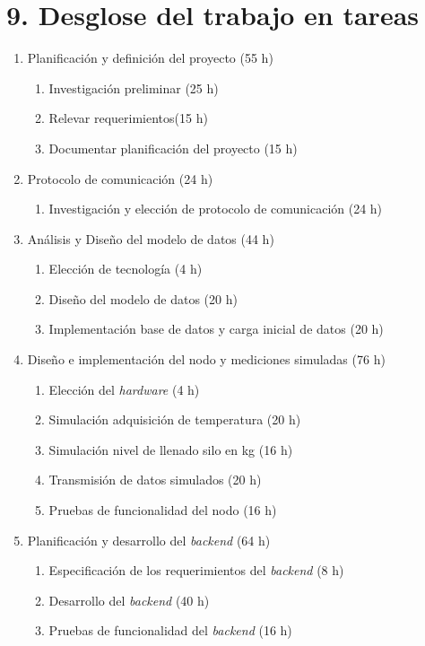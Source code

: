 \documentclass[
11pt, %
]{charter}
\begin{document}
\section{9. Desglose del trabajo en tareas}
\label{sec:wbs}

\begin{enumerate}
\item Planificación y definición del proyecto (55 h)
	\begin{enumerate}
	\item Investigación preliminar (25 h)
	\item Relevar requerimientos(15 h)
	\item Documentar planificación del proyecto (15 h)
	\end{enumerate}
\item Protocolo de comunicación (24 h)
	\begin{enumerate}
	\item Investigación y elección de protocolo de comunicación (24 h)
	\end{enumerate}
\item Análisis y Diseño del modelo de datos (44 h)
	\begin{enumerate}
	\item Elección de tecnología (4 h)
	\item Diseño del modelo de datos (20 h)
	\item Implementación base de datos y carga inicial de datos (20 h)
	\end{enumerate}
\item Diseño e implementación del nodo y mediciones simuladas (76 h)
	\begin{enumerate}
	\item Elección del \textit{hardware} (4 h)
	\item Simulación adquisición de temperatura (20 h)
	\item Simulación nivel de llenado silo en kg (16 h)
	\item Transmisión de datos simulados (20 h)
	\item Pruebas de funcionalidad del nodo (16 h)
	\end{enumerate}	
\item Planificación y desarrollo del \textit{backend} (64 h)
	\begin{enumerate}
	\item Especificación de los requerimientos del \textit{backend} (8 h)
	\item Desarrollo del \textit{backend} (40 h)
	\item Pruebas de funcionalidad del \textit{backend} (16 h)

\end{enumerate}
\end{enumerate}
\end{document}

